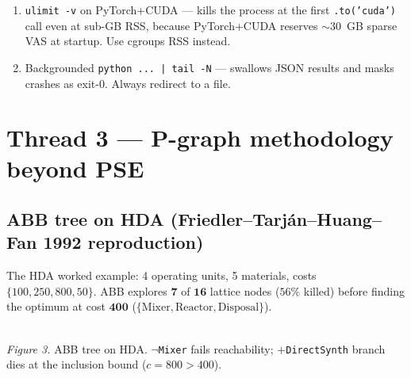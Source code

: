 \documentclass[11pt,a4paper]{article}
\newcommand{\code}[1]{\texttt{\small #1}}
\begin{document}
\begin{enumerate}
  \item \texttt{ulimit -v} on PyTorch+CUDA --- kills the process at
        the first \code{.to('cuda')} call even at sub-GB RSS,
        because PyTorch+CUDA reserves ${\sim}30$~GB sparse VAS at
        startup. Use cgroups RSS instead.
  \item Backgrounded \code{python ... | tail -N} --- swallows JSON
        results and masks crashes as exit-0. Always redirect to a file.
\end{enumerate}

\section{Thread 3 --- P-graph methodology beyond PSE}

\subsection{ABB tree on HDA (Friedler--Tarj\'an--Huang--Fan 1992 reproduction)}

The HDA worked example: 4 operating units, 5 materials, costs
$\{100, 250, 800, 50\}$. ABB explores $\mathbf{7}$ of $\mathbf{16}$
lattice nodes ($56\%$ killed) before finding the optimum at
cost $\mathbf{400}$ ($\{\text{Mixer}, \text{Reactor}, \text{Disposal}\}$).

\begin{center}
\\
\small\textit{Figure 3.} ABB tree on HDA. \code{$\lnot$Mixer} fails reachability;
\code{$+$DirectSynth} branch dies at the inclusion bound ($c=800>400$).
\end{center}
\end{document}
